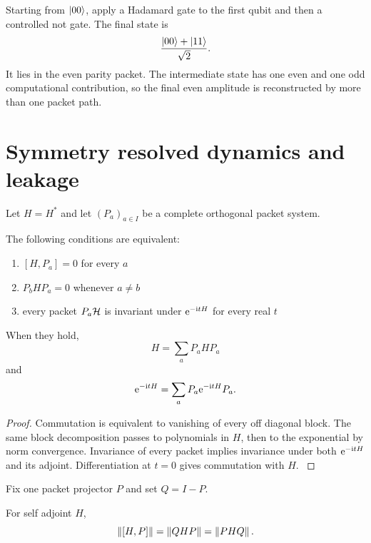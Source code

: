 \begin{example}\label{strong:example:001}\label{strong:ex:bell_circuit}
Starting from \(\left|00\right\rangle\), apply a Hadamard gate to the first qubit and then a controlled not gate. The final state is
\[
\frac{\left|00\right\rangle+\left|11\right\rangle}{\sqrt2}.
\]
It lies in the even parity packet. The intermediate state has one even and one odd computational contribution, so the final even amplitude is reconstructed by more than one packet path.
\end{example}

\section{Symmetry resolved dynamics and leakage}\label{strong:section:005}\label{strong:sec:dynamics}

Let \(H=H^*\) and let \((P_a)_{a\in I}\) be a complete orthogonal packet system.

\begin{theorem}\label{strong:theorem:010}\label{strong:thm:invariant_packets}
The following conditions are equivalent:
\begin{enumerate}
\item \([H,P_a]=0\) for every \(a\)
\item \(P_bHP_a=0\) whenever \(a\neq b\)
\item every packet \(P_a\mathcal H\) is invariant under \(\mathrm e^{-\mathrm i tH}\) for every real \(t\)
\end{enumerate}
When they hold,
\[
H=\sum_aP_aHP_a
\]
and
\[
\mathrm e^{-\mathrm i tH}=\sum_aP_a\mathrm e^{-\mathrm i tH}P_a.
\]
\end{theorem}

\begin{proof}\label{strong:proof:017}
Commutation is equivalent to vanishing of every off diagonal block. The same block decomposition passes to polynomials in \(H\), then to the exponential by norm convergence. Invariance of every packet implies invariance under both \(\mathrm e^{-\mathrm i tH}\) and its adjoint. Differentiation at \(t=0\) gives commutation with \(H\).
\label{strong:proof:017:end}\end{proof}

Fix one packet projector \(P\) and set \(Q=I-P\).

\begin{lemma}\label{strong:lemma:001}\label{strong:lem:off_diagonal_norm}
For self adjoint \(H\),
\[
\left\lVert[H,P]\right\rVert=\left\lVert QHP\right\rVert=\left\lVert PHQ\right\rVert.
\]
\end{lemma}

